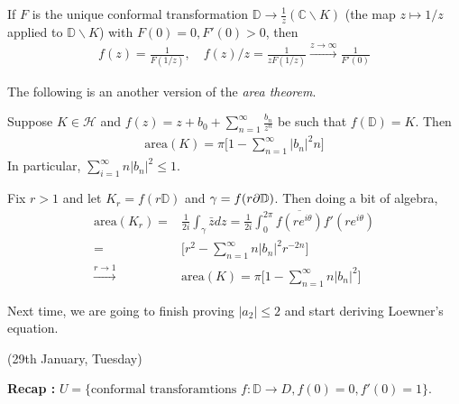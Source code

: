 \documentclass[12pt,a4paper]{article}
\newenvironment{proof}
{\begin{changemargin}{0.5cm}{0.5cm} 
	}%
	{\end{changemargin}
}
\begin{document}
If $F$ is the unique conformal transformation $\mathbb{D} \rightarrow \frac{1}{z} (\mathbb{C}\backslash K)$ (the map $z\mapsto 1/z$ applied to $\mathbb{D} \backslash K$) with $F(0) =0, F'(0)>0$, then
\begin{align*}
f(z) = \frac{1}{F(1/z)}, \quad f(z)/z = \frac{1}{zF(1/z)} \xrightarrow{z\rightarrow \infty} \frac{1}{F'(0)}
\end{align*}
\s

The following is an another version of the \emph{area theorem}.
\s

 Suppose $K \in \mathcal{H}$ and $f(z) = z+ b_0 + \sum_{n=1}^{\infty}\frac{b_n}{z^n}$ be such that $f(\mathbb{D})=K$. Then 
\begin{align*}
\text{area}(K) = \pi \Big[ 1- \sum_{n=1}^{\infty} |b_n|^2 n\Big]
\end{align*} 
In particular, $\sum_{i=1}^{\infty} n|b_n|^2 \leq 1$.
\begin{proof}
\pf Fix $r>1$ and let $K_r = f(r\mathbb{D})$ and $\gamma = f(r \partial \mathbb{D})$. Then doing a bit of algebra,
\begin{align*}
\text{area}(K_r) = &\frac{1}{2i} \int_{\gamma}\bar{z} dz = \frac{1}{2i} \int_0^{2\pi} \overline{f(re^{i\theta})} f'(re^{i\theta}) \\
= &\Big[ r^2 - \sum_{n=1}^{\infty} n|b_n|^2 r^{-2n}\Big] \\
\xrightarrow{r\rightarrow 1}\,\, & \text{area}(K) = \pi\Big[ 1- \sum_{n=1}^{\infty} n|b_n|^2\Big]
\end{align*}
\eop
\end{proof}

Next time, we are going to finish proving $|a_2|\leq 2$ and start deriving Loewner's equation.
\s

\newday

(29th January, Tuesday)
\s

\textbf{Recap :} $U = \{\text{conformal transforamtions } f: \mathbb{D} \rightarrow D, f(0)=0, f'(0)=1 \}$.
\s
\end{document}
